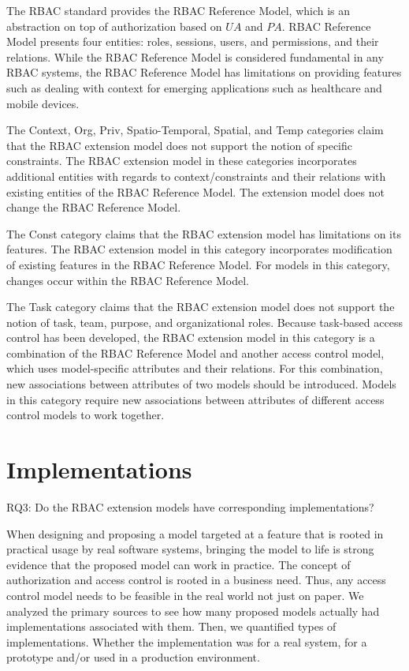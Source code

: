 The RBAC standard provides the RBAC Reference Model, which is an abstraction on top of authorization based on $UA$ and $PA$. RBAC Reference Model presents four entities: roles, sessions, users, and permissions, and their relations. While the RBAC Reference Model is considered fundamental in any RBAC systems, the RBAC Reference Model has limitations on providing features such as dealing with context for emerging applications such as healthcare and mobile devices. 

The Context, Org, Priv, Spatio-Temporal, Spatial, and Temp categories claim that the RBAC extension model does not support the notion of specific constraints. The RBAC extension model in these categories incorporates additional entities with regards to context/constraints and their relations with existing entities of the RBAC Reference Model. The extension model does not change the RBAC Reference Model.

The Const category claims that the RBAC extension model has limitations on its features. The RBAC extension model in this category incorporates modification of existing features in the RBAC Reference Model. For models in this category, changes occur within the RBAC Reference Model.

The Task category claims that the RBAC extension model does not support the notion of task, team, purpose, and organizational roles. Because task-based access control has been developed, the RBAC extension model in this category is a combination of the RBAC Reference Model and another access control model, which uses model-specific attributes and their relations. For this combination, new associations between attributes of two models should be introduced. Models in this category require new associations between attributes of different access control models to work together.


\section{Implementations} \label{sec:implementations}

RQ3: Do the RBAC extension models have corresponding implementations?

When designing and proposing a model targeted at a feature that is rooted in practical
usage by real software systems, bringing the model to life is strong evidence that the
proposed model can work in practice. The concept of authorization and access control
is rooted in a business need. Thus, any access control model needs to be feasible
in the real world not just on paper. We analyzed the primary sources to see how many
proposed models actually had implementations associated with them.  Then, we quantified
types of implementations. Whether the implementation was for a real system, for a prototype
and/or used in a production environment.

